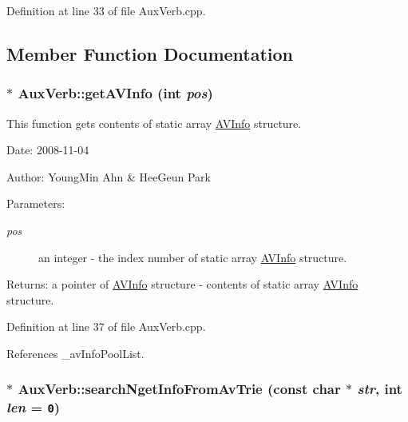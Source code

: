 Definition at line 33 of file AuxVerb.cpp.

\subsection{Member Function Documentation}
\hypertarget{classkmaOrange_1_1AuxVerb_e56921cf22a0283c83ccbdb24187b6c7}{
\subsubsection[{getAVInfo}]{ $\ast$ AuxVerb::getAVInfo (int {\em pos})}}
\label{classkmaOrange_1_1AuxVerb_e56921cf22a0283c83ccbdb24187b6c7}


This function gets contents of static array \hyperlink{structkmaOrange_1_1AVInfo}{AVInfo} structure. 

\begin{Desc}
\item[Date:]2008-11-04 \end{Desc}
\begin{Desc}
\item[Author:]YoungMin Ahn \& HeeGeun Park \end{Desc}
\begin{Desc}
\item[Parameters:]
\begin{description}
\item[{\em pos}]an integer - the index number of static array \hyperlink{structkmaOrange_1_1AVInfo}{AVInfo} structure. \end{description}
\end{Desc}
\begin{Desc}
\item[Returns:]a pointer of \hyperlink{structkmaOrange_1_1AVInfo}{AVInfo} structure - contents of static array \hyperlink{structkmaOrange_1_1AVInfo}{AVInfo} structure. \end{Desc}


Definition at line 37 of file AuxVerb.cpp.

References \_\-avInfoPoolList.\hypertarget{classkmaOrange_1_1AuxVerb_68664b5fafa56a3c08bab09baa569f8f}{
\subsubsection[{searchNgetInfoFromAvTrie}]{ $\ast$ AuxVerb::searchNgetInfoFromAvTrie (const char $\ast$ {\em str}, \/  int {\em len} = {\tt 0})}}
\label{classkmaOrange_1_1AuxVerb_68664b5fafa56a3c08bab09baa569f8f}


